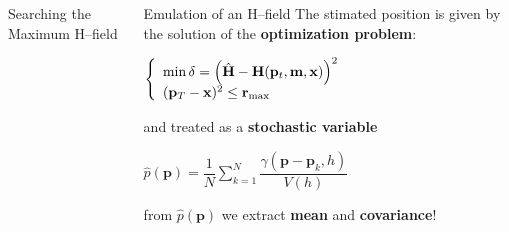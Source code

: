 {\begin{columns}[c]
\begin{block}{Searching the Maximum H--field}
\begin{algorithm}[H]
	\end{algorithm}
	\vspace{0.75cm}

	\end{block}
	\begin{block}{Emulation of an H--field}
		\vspace{0.75cm}
		The stimated position is given by the solution of the \textbf{optimization problem}:
		\vspace{0.5cm}
		
		$\left\{\begin{array}{l}\mathrm{min}\, \delta = \left( \hat{\mathbf{H}} - \mathbf{H}(\mathbf{p}_t, \mathbf{m}, \mathbf{x}) \right)^2 \\ (\mathbf{p}_T-\mathbf{x})^2 \leq \mathbf{r}_{\mathrm{max}}\end{array}\right.$
		\vspace{0.5cm}
		
		and treated as a \textbf{stochastic variable}
		\vspace{1cm}
		
		$\hat{p}(\mathbf{p}) = \dfrac{1}{N}\sum\limits_{k=1}^{N} \dfrac{\gamma(\mathbf{p}-\mathbf{p}_k,h)}{V(h)}$

		\vspace{1cm}
		from $\hat{p}(\mathbf{p})$ we extract \textbf{mean} and \textbf{covariance}!
		\vspace{0.90cm}
	\end{block}
	\end{columns}
}